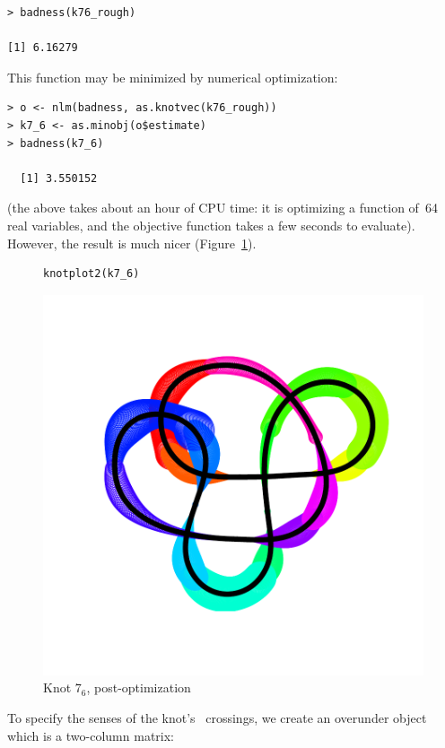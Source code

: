 \documentclass{birkjour}
\theoremstyle{definition}
\theoremstyle{remark}
\numberwithin{equation}{section}
\begin{document}
\begin{verbatim}
> badness(k76_rough)

[1] 6.16279
\end{verbatim}

This function may be minimized by numerical optimization:

\begin{verbatim}
> o <- nlm(badness, as.knotvec(k76_rough))
> k7_6 <- as.minobj(o$estimate)
> badness(k7_6)

  [1] 3.550152
\end{verbatim}

(the above takes about an hour of CPU time: it is optimizing a
function of~64 real variables, and the objective function takes a few
seconds to evaluate).  However, the result is much nicer
(Figure~\ref{7_6}).

\begin{figure}[!tbp]
\begin{verbatim}
knotplot2(k7_6)
\end{verbatim}
  \centering
\includegraphics[scale = 0.9]{knot-k76_knotplot2}
\caption{Knot $7_6$, post-optimization\label{7_6}}
\end{figure}
   
To specify the senses of the knot's\ %
crossings, we create an overunder object which is a two-column matrix:
\end{document}
